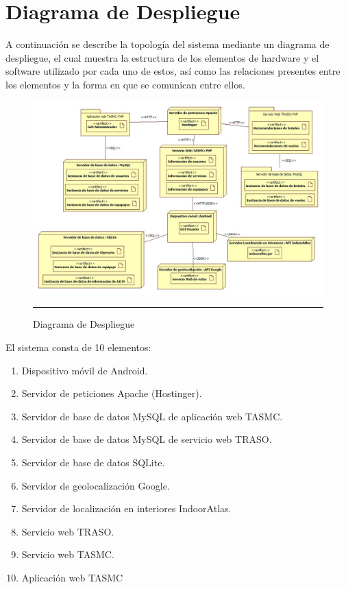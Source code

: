 \clearpage
\section{Diagrama de Despliegue}

A continuación se describe la topología del sistema mediante un diagrama de despliegue, el cual muestra la estructura de los elementos de hardware y el software utilizado por cada uno de estos, así como las relaciones presentes entre los elementos y la forma en que se comunican entre ellos.

\begin{figure}[h]
	\centering
		\includegraphics[width=1\textwidth]{Figuras/despliegue2.jpg}
		\rule{30em}{0.5pt}
	\caption[Diagrama de Despliegue]{Diagrama de Despliegue}
	\label{fig:diagramaDespliegue}
\end{figure}

El sistema consta de 10 elementos:

\begin{enumerate}
\item Dispositivo móvil de Android.
\item Servidor de peticiones Apache (Hostinger).
\item Servidor de base de datos MySQL de aplicación web TASMC.
\item Servidor de base de datos MySQL de servicio web TRASO.
\item Servidor de base de datos SQLite.
\item Servidor de geolocalización Google.
\item Servidor de localización en interiores IndoorAtlas.
\item Servicio web TRASO.
\item Servicio web TASMC.
\item Aplicación web TASMC
\end{enumerate}

